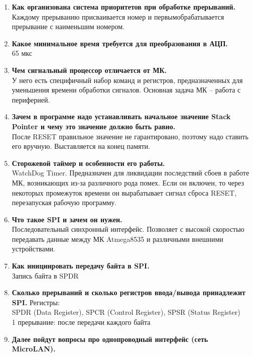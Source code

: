 \documentclass[a4paper, 12pt, twoside]{article}
\begin{document}
\begin{enumerate}
		cli – общее запрещение, sei – общее разрешение
	\item \textbf{Как организована система приоритетов при обработке прерываний.}\\
		Каждому прерыванию присваивается номер и первымобрабатывается прерывание с наименьшим номером.
	\item \textbf{Какое минимальное время требуется для преобразования в АЦП.}\\
		65 мкс
	\item \textbf{Чем сигнальный процессор отличается от МК.}\\
		У него есть специфичный набор команд и регистров, предназначенных для уменьшения времени обработки сигналов. Основная задача МК – работа с периферией.
	\item \textbf{Зачем в программе надо устанавливать начальное значение Stack Pointer
и чему это значение должно быть равно.}\\
		После RESET правильное значение не гарантировано, поэтому надо ставить его вручную. Выставляется на конец памяти.
	\item \textbf{Сторожевой таймер и особенности его работы.}\\
		WatchDog Timer. Предназначен для ликвидации последствий сбоев в работе МК, возникающих из-за различного рода помех. Если он включен, то через некоторых промежуток времени он вырабатывает сигнал сброса RESET, перезапуская рабочую программу.
	\item \textbf{Что такое SPI и зачем он нужен.}\\
		Последовательный синхронный интерфейс. Позволяет с высокой скоростью передавать данные между МК Atmega8535 и различными внешними устройствами.
	\item \textbf{Как инициировать передачу байта в SPI.}\\
		Запись байта в SPDR
	\item \textbf{Сколько прерываний и сколько регистров ввода/вывода принадлежит SPI.}
		Регистры:\\
		SPDR (Data Register), SPCR (Control Register), SPSR (Status Register)\\
		1 прерывание: после передачи каждого байта
	\item \textbf{Далее пойдут вопросы про однопроводный интерфейс (сеть MicroLAN).}\\


\end{enumerate}
\end{document}
